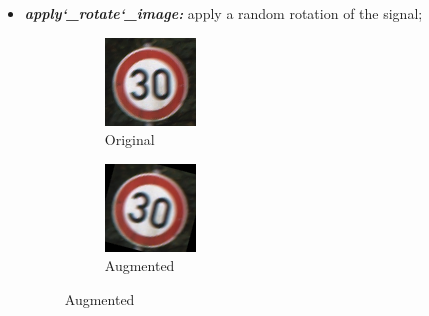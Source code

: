 \begin{itemize}
\item \textbf{\textit{apply\char`_rotate\char`_image:}} apply a random rotation of the signal;
\begin{figure}[!ht]
\centering
\begin{subfigure}{.2\textwidth}
  \centering
  \includegraphics[width=.8\linewidth]{img/00001_00011_00027.png}
  \caption{Original}
  \label{fig:sub1}
\end{subfigure}%
\begin{subfigure}{.2\textwidth}
  \centering
  \includegraphics[width=.8\linewidth]{img/3.png}
  \caption{Augmented}
  \label{fig:sub2}
\end{subfigure}
\end{figure}


\end{itemize}
